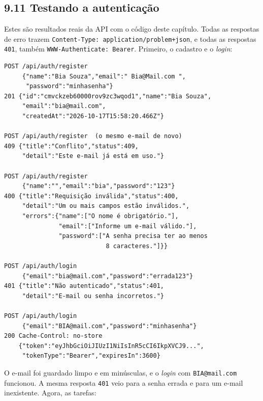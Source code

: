 \subsection{9.11 Testando a autenticação}

Estes são resultados reais da API com o código deste capítulo. Todas as respostas de erro trazem \texttt{Content-Type: application/problem+json}, e todas as respostas \texttt{401}, também \texttt{WWW-Authenticate: Bearer}. Primeiro, o cadastro e o \textit{login}:

\begin{codigo}
\begin{Verbatim}[breaklines=true, breaksymbolleft={}, fontsize=\footnotesize]
POST /api/auth/register
     {"name":"Bia Souza","email":" Bia@Mail.com ",
      "password":"minhasenha"}
201 {"id":"cmvckzeb60000rov9zc3wqod1","name":"Bia Souza",
     "email":"bia@mail.com",
     "createdAt":"2026-10-17T15:58:20.466Z"}

POST /api/auth/register  (o mesmo e-mail de novo)
409 {"title":"Conflito","status":409,
     "detail":"Este e-mail já está em uso."}

POST /api/auth/register
     {"name":"","email":"bia","password":"123"}
400 {"title":"Requisição inválida","status":400,
     "detail":"Um ou mais campos estão inválidos.",
     "errors":{"name":["O nome é obrigatório."],
               "email":["Informe um e-mail válido."],
               "password":["A senha precisa ter ao menos
                            8 caracteres."]}}

POST /api/auth/login
     {"email":"bia@mail.com","password":"errada123"}
401 {"title":"Não autenticado","status":401,
     "detail":"E-mail ou senha incorretos."}

POST /api/auth/login
     {"email":"BIA@mail.com","password":"minhasenha"}
200 Cache-Control: no-store
    {"token":"eyJhbGciOiJIUzI1NiIsInR5cCI6IkpXVCJ9...",
     "tokenType":"Bearer","expiresIn":3600}
\end{Verbatim}
\end{codigo}

O e-mail foi guardado limpo e em minúsculas, e o \textit{login} com \texttt{BIA@mail.com} funcionou. A mesma resposta \texttt{401} veio para a senha errada e para um e-mail inexistente. Agora, as tarefas:

